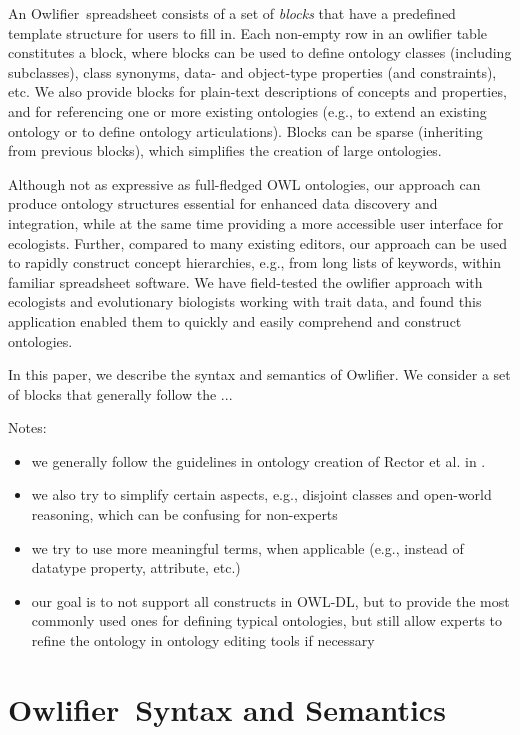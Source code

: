 \documentclass[preprint,number]{elsarticle}
\newcommand{\owlifier}{\textsf{Owlifier}}
\begin{document}
An \owlifier\ spreadsheet consists of a set of \emph{blocks} that have
a predefined template structure for users to fill in. Each non-empty
row in an owlifier table constitutes a block, where blocks can be used
to define ontology classes (including subclasses), class synonyms,
data- and object-type properties (and constraints), etc.  We also
provide blocks for plain-text descriptions of concepts and properties,
and for referencing one or more existing ontologies (e.g., to extend
an existing ontology or to define ontology articulations). Blocks can
be sparse (inheriting from previous blocks), which simplifies the
creation of large ontologies. 

Although not as expressive as full-fledged OWL ontologies, our
approach can produce ontology structures essential for enhanced data
discovery and integration, while at the same time providing a more
accessible user interface for ecologists. Further, compared to many
existing editors, our approach can be used to rapidly construct
concept hierarchies, e.g., from long lists of keywords, within
familiar spreadsheet software. We have field-tested the owlifier
approach with ecologists and evolutionary biologists working with
trait data, and found this application enabled them to quickly and
easily comprehend and construct ontologies.

In this paper, we describe the syntax and semantics of \owlifier. We
consider a set of blocks that generally follow the ... 

Notes:
\begin{itemize}
\item we generally follow the guidelines in ontology creation of
  Rector et al. in \cite{rector04:_owl_pizzas}.
\item we also try to simplify certain aspects, e.g., disjoint classes
  and open-world reasoning, which can be confusing for non-experts
\item we try to use more meaningful terms, when applicable (e.g.,
  instead of datatype property, attribute, etc.)
\item our goal is to not support all constructs in OWL-DL, but to
  provide the most commonly used ones for defining typical ontologies,
  but still allow experts to refine the ontology in ontology editing
  tools if necessary
\end{itemize}


\section{\owlifier\ Syntax and Semantics}
\end{document}

